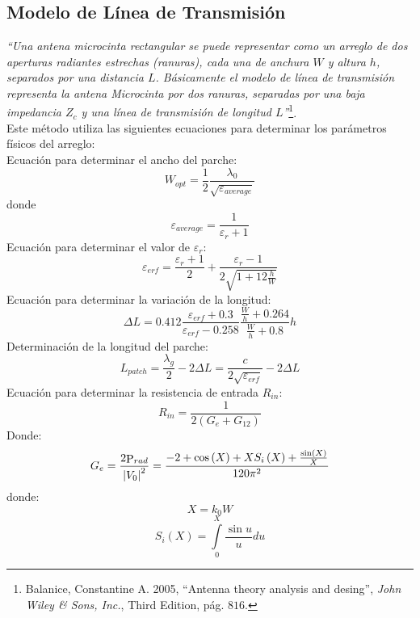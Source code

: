 \documentclass[twocolumn]{IEEEtran}
\begin{document}
\subsection{Modelo de Línea de Transmisión}
\noindent
\textit{``Una antena microcinta rectangular se puede representar como un arreglo de dos aperturas radiantes estrechas (ranuras), cada una de anchura $W$ y altura $h$, separados por una distancia $L$. Básicamente el modelo de línea de transmisión representa la antena Microcinta por dos ranuras, separadas por una baja impedancia $Z_c$ y una línea de transmisión de longitud $L$''}\footnote{Balanice, Constantine A. 2005, ``Antenna theory analysis and desing'', \textit{John Wiley \& Sons, Inc.}, Third Edition, pág. $816$.}.\\
Este método utiliza las siguientes ecuaciones para determinar los parámetros físicos del arreglo:\\
Ecuación para determinar el ancho del parche:
\begin{equation}
  W_{opt}  = \frac{1}{2}\frac{{\lambda _0 }}{{\sqrt {\varepsilon _{average} } }}
\label{ecu1}
\end{equation}
\noindent
donde
\begin{equation*}
 \varepsilon _{average}  = \frac{1}{{\varepsilon _r  + 1}}
\end{equation*}
\noindent
Ecuación para determinar el valor de $\varepsilon _r$:
\begin{equation}
 \varepsilon _{erf}  = \frac{{\varepsilon _r  + 1}}{2} + \frac{{\varepsilon _r  - 1}}{{2\sqrt {1 + 12\frac{h}{W}} }}
\label{ecu2}
\end{equation}
\noindent
Ecuación para determinar la variación de la longitud:
\begin{equation}
 \Delta L = 0.412\frac{{\varepsilon _{erf}  + 0.3}}{{\varepsilon _{erf}  - 0.258}}\frac{{\frac{W}{h} + 0.264}}{{\frac{W}{h} + 0.8}}h
\label{ecu3}
\end{equation}
\noindent
Determinación de la longitud del parche:
\begin{equation}
 L_{patch} = \frac{{\lambda _g }}{2} - 2\Delta L = \frac{c}{{2\sqrt {\varepsilon _{erf} } }} - 2\Delta L
\label{ecu4}
\end{equation}
Ecuación para determinar la resistencia de entrada $R_{in}$:
\begin{equation}
 R_{in}  = \frac{1}{{2\left( {G_e  + G_{12} } \right)}}
\label{ecu7}
\end{equation}
\noindent
Donde:
\begin{equation}
 G_e  = \frac{{2{\mathop{\rm P}\nolimits} _{rad} }}{{\left| {V_0 } \right|^2 }} = \frac{{ - 2 + \cos \left( X \right) + XS_i \left( X \right) + \frac{{\sin \left( X \right)}}{X}}}{{120\pi ^2 }}
\label{ecu5}
\end{equation}
\noindent
donde:
$$X = k_0 W$$
$${S_i \left( X \right)} = \int\limits_0^X {\frac{{\sin u}}{u}du}$$
\end{document}
